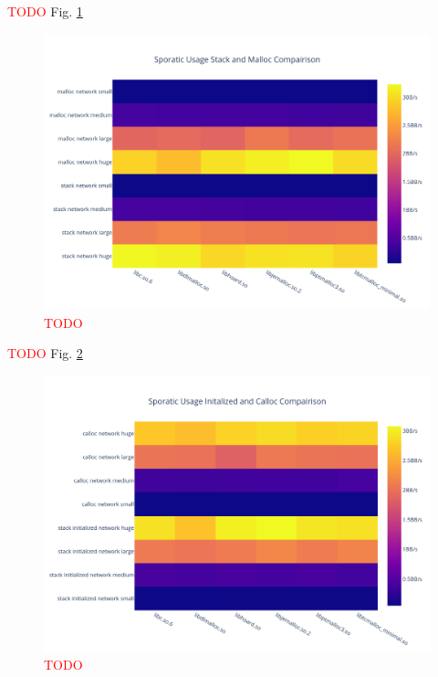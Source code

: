 \documentclass[letterpaper, 10 pt, conference]{ieeeconf}  %
\newcommand*\todo[0]{\textcolor{red}{TODO }}
\begin{document}
\todo Fig. \ref{algo3_stack_malloc_hist}

\begin{figure}[tbh!]
  \centering
  \includegraphics[width=\columnwidth]{graphs/sporatic_stack_malloc_hist.png}
  \caption{ \todo }
  \label{algo3_stack_malloc_hist}
\end{figure}

\todo Fig. \ref{algo3_init_calloc_hist}

\begin{figure}[tbh!]
  \centering
  \includegraphics[width=\columnwidth]{graphs/sporatic_init_calloc_hist.png}
  \caption{ \todo }
  \label{algo3_init_calloc_hist}
\end{figure}

\end{document}
